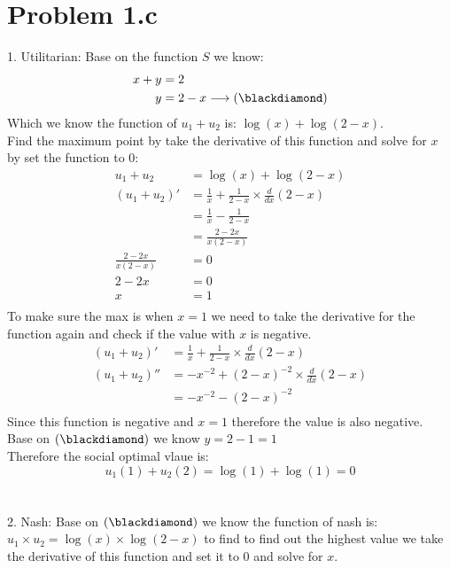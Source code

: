 \documentclass{article}
\begin{document}
\newpage
\section{Problem 1.c}
1. Utilitarian: Base on the function $S$ we know:
\begin{align*}
x + y &= 2\\
y &= 2-x \longrightarrow (\blackdiamond)
\end{align*}
Which we know the function of $u_1 + u_2$ is: $\log(x) + \log(2-x)$.\\
Find the maximum point by take the derivative of this function and solve for $x$ by set the function to $0$:
\begin{align*}
u_1 + u_2 &= \log(x) + \log(2-x)\\
(u_1 + u_2)' &= \frac{1}{x} + \frac{1}{2-x} \times \frac{d}{dx}(2-x)\\
&= \frac{1}{x} - \frac{1}{2-x}\\
&= \frac{2-2x}{x(2-x)}\\
\frac{2-2x}{x(2-x)} &= 0\\
2-2x &= 0\\
x &= 1\\
\end{align*}
To make sure the max is when $x = 1$ we need to take the derivative for the function again and check if the value with $x$ is negative.
\begin{align*}
(u_1 + u_2)' &= \frac{1}{x} + \frac{1}{2-x} \times \frac{d}{dx}(2-x)\\
(u_1 + u_2)'' &= -x^{-2} + (2-x)^{-2} \times \frac{d}{dx}(2-x) \\
&= -x^{-2} - (2-x)^{-2}\\
\end{align*}
Since this function is negative and $x = 1$ therefore the value is also negative.\\
Base on $(\blackdiamond)$ we know $y = 2-1 = 1$\\
Therefore the social optimal vlaue is:
$$u_1(1) + u_2(2) = \log(1) + \log(1) = 0$$\\\\
2. Nash: Base on $(\blackdiamond)$ we know the function of nash is: $u_1 \times u_2 = \log(x) \times \log(2-x)$ to find to find out the highest value we take the derivative of this function and set it to $0$ and solve for $x$.
\end{document}
